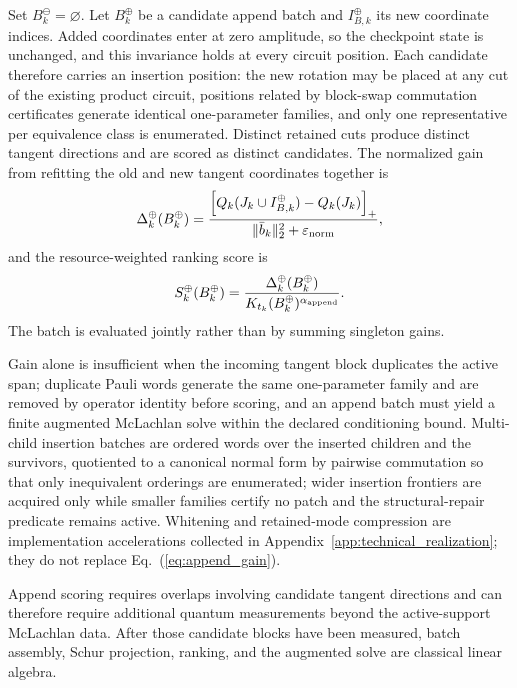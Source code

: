 \documentclass[
  reprint,
  amsmath,
  amssymb,
  aps,
  pra,
  nofootinbib,
  superscriptaddress,
  floatfix
]{revtex4-2}
\newcommand{\eps}{\varepsilon}
\begin{document}
Set \(B_k^{\ominus}=\varnothing\).  Let \(B_k^{\oplus}\) be a candidate append batch and \(I_{B,k}^{\oplus}\) its new coordinate indices.  Added coordinates enter at zero amplitude, so the checkpoint state is unchanged, and this invariance holds at every circuit position.  Each candidate therefore carries an insertion position: the new rotation may be placed at any cut of the existing product circuit, positions related by block-swap commutation certificates generate identical one-parameter families, and only one representative per equivalence class is enumerated.  Distinct retained cuts produce distinct tangent directions and are scored as distinct candidates.  The normalized gain from refitting the old and new tangent coordinates together is
\begin{equation}
\Delta_k^{\oplus}(B_k^{\oplus})
=
\frac{
\left[
Q_k(J_k\cup I_{B,k}^{\oplus})
-Q_k(J_k)
\right]_+
}{
\|\bar b_k\|_2^2+\eps_{\rm norm}
},
\label{eq:append_gain}
\end{equation}
and the resource-weighted ranking score is
\begin{equation}
S_k^{\oplus}(B_k^{\oplus})
=
\frac{
\Delta_k^{\oplus}(B_k^{\oplus})
}{
K_{t_k}(B_k^{\oplus})^{\alpha_{\rm append}}
}.
\label{eq:append_score}
\end{equation}
The batch is evaluated jointly rather than by summing singleton gains.

Gain alone is insufficient when the incoming tangent block duplicates the active span; duplicate Pauli words generate the same one-parameter family and are removed by operator identity before scoring, and an append batch must yield a finite augmented McLachlan solve within the declared conditioning bound.  Multi-child insertion batches are ordered words over the inserted children and the survivors, quotiented to a canonical normal form by pairwise commutation so that only inequivalent orderings are enumerated; wider insertion frontiers are acquired only while smaller families certify no patch and the structural-repair predicate remains active.  Whitening and retained-mode compression are implementation accelerations collected in Appendix~\ref{app:technical_realization}; they do not replace Eq.~(\ref{eq:append_gain}).

Append scoring requires overlaps involving candidate tangent directions and can therefore require additional quantum measurements beyond the active-support McLachlan data.  After those candidate blocks have been measured, batch assembly, Schur projection, ranking, and the augmented solve are classical linear algebra.
\end{document}
